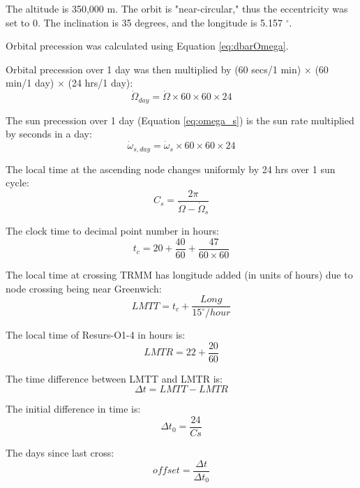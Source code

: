 \documentclass[conf]{new-aiaa}
\begin{document}
The altitude is 350,000 m. The orbit is "near-circular," thus the eccentricity was set to 0.  The inclination is 35 degrees, and the longitude is 5.157 $^\circ$. \newline 

Orbital precession was calculated using Equation \ref{eq:dbarOmega}. 

Orbital precession over 1 day was then multiplied by (60 secs/1 min) $\times$ (60 min/1 day) $\times$ (24 hrs/1 day): 
\begin{equation}
	\dot{\Omega}_{day} = \dot{\Omega} \times 60 \times 60 \times 24
\end{equation}

The sun precession over 1 day (Equation \ref{eq:omega_s}) is the sun rate multiplied by seconds in a day: 
\begin{equation}
	\dot{\omega}_{s, day} = \dot{\omega}_s \times 60 \times 60 \times 24
\end{equation}

The local time at the ascending node changes uniformly by 24 hrs over 1 sun cycle: 
\begin{equation}
	C_s = \dfrac{2 \pi}{\dot{\Omega} - \dot{\Omega}_s}
\end{equation}

The clock time to decimal point number in hours: 
\begin{equation}
	t_c = 20 + \dfrac{40}{60} + \dfrac{47}{60 \times 60}
\end{equation}

The local time at crossing TRMM has longitude added (in units of hours) due to node crossing being near Greenwich: 
\begin{equation}
	LMTT = t_c + \dfrac{Long}{15 ^\circ /hour}
\end{equation}

The local time of Resurs-O1-4 in hours is: 
\begin{equation}
	LMTR = 22 + \dfrac{20}{60}
\end{equation}

The time difference between LMTT and LMTR is: 
\begin{equation}
	\Delta t = LMTT - LMTR 
\end{equation}

The initial difference in time is: 
\begin{equation}
	\Delta t_0 = \dfrac{24}{Cs}
\end{equation}

The days since last cross: 
\begin{equation}
	offset = \dfrac{\Delta t }{\Delta t_0}
\end{equation}
\end{document}
